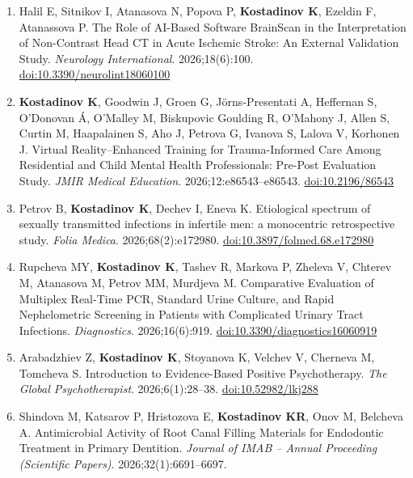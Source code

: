 \documentclass[
  10.5pt,
  a4paper,
  DIV=11,
  numbers=noendperiod]{scrartcl}
\begin{document}
\begin{enumerate}
  Atanassova P. Cognitive Performance in Transfusion-Dependent Adults
  with β-Thalassemia in Bulgaria: A Case--Control Study. \emph{Neurology
  International}. 2026;18(6):101.
  \href{https://doi.org/10.3390/neurolint18060101}{doi:10.3390/neurolint18060101}
\item
  Halil E, Sitnikov I, Atanasova N, Popova P, \textbf{Kostadinov K},
  Ezeldin F, Atanassova P. The Role of AI-Based Software BrainScan in
  the Interpretation of Non-Contrast Head CT in Acute Ischemic Stroke:
  An External Validation Study. \emph{Neurology International}.
  2026;18(6):100.
  \href{https://doi.org/10.3390/neurolint18060100}{doi:10.3390/neurolint18060100}
\item
  \textbf{Kostadinov K}, Goodwin J, Groen G, Jörns‑Presentati A,
  Heffernan S, O'Donovan Á, O'Malley M, Biskupovic Goulding R, O'Mahony
  J, Allen S, Curtin M, Haapalainen S, Aho J, Petrova G, Ivanova S,
  Lalova V, Korhonen J. Virtual Reality--Enhanced Training for
  Trauma-Informed Care Among Residential and Child Mental Health
  Professionals: Pre-Post Evaluation Study. \emph{JMIR Medical
  Education}. 2026;12:e86543--e86543.
  \href{https://doi.org/10.2196/86543}{doi:10.2196/86543}
\item
  Petrov B, \textbf{Kostadinov K}, Dechev I, Eneva K. Etiological
  spectrum of sexually transmitted infections in infertile men: a
  monocentric retrospective study. \emph{Folia Medica}.
  2026;68(2):e172980.
  \href{https://doi.org/10.3897/folmed.68.e172980}{doi:10.3897/folmed.68.e172980}
\item
  Rupcheva MY, \textbf{Kostadinov K}, Tashev R, Markova P, Zheleva V,
  Chterev M, Atanasova M, Petrov MM, Murdjeva M. Comparative Evaluation
  of Multiplex Real-Time PCR, Standard Urine Culture, and Rapid
  Nephelometric Screening in Patients with Complicated Urinary Tract
  Infections. \emph{Diagnostics}. 2026;16(6):919.
  \href{https://doi.org/10.3390/diagnostics16060919}{doi:10.3390/diagnostics16060919}
\item
  Arabadzhiev Z, \textbf{Kostadinov K}, Stoyanova K, Velchev V, Cherneva
  M, Tomcheva S. Introduction to Evidence-Based Positive Psychotherapy.
  \emph{The Global Psychotherapist}. 2026;6(1):28--38.
  \href{https://doi.org/10.52982/lkj288}{doi:10.52982/lkj288}
\item
  Shindova M, Katsarov P, Hristozova E, \textbf{Kostadinov KR}, Onov M,
  Belcheva A. Antimicrobial Activity of Root Canal Filling Materials for
  Endodontic Treatment in Primary Dentition. \emph{Journal of IMAB --
  Annual Proceeding (Scientific Papers)}. 2026;32(1):6691--6697.

\end{enumerate}
\end{document}

